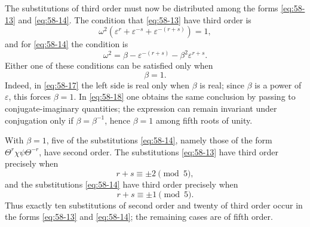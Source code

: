 \documentclass[11pt]{article}
\newcommand{\eps}{\varepsilon}
\begin{document}
The substitutions of third order must now be distributed among the forms \eqref{eq:58-13} and \eqref{eq:58-14}.  The condition that \eqref{eq:58-13} have third order is
\begin{equation}\label{eq:58-17}
 \omega^2(\eps^r+\eps^{-s}+\eps^{-(r+s)})=1,
\end{equation}
and for \eqref{eq:58-14} the condition is
\begin{equation}\label{eq:58-18}
 \omega^2=\beta-\eps^{-(r+s)}-\beta^2\eps^{r+s}.
\end{equation}
Either one of these conditions can be satisfied only when
\[
 \beta=1.
\]
Indeed, in \eqref{eq:58-17} the left side is real only when \(\beta\) is real; since \(\beta\) is a power of \(\eps\), this forces \(\beta=1\).  In \eqref{eq:58-18} one obtains the same conclusion by passing to conjugate-imaginary quantities; the expression can remain invariant under conjugation only if \(\beta=\beta^{-1}\), hence \(\beta=1\) among fifth roots of unity.

With \(\beta=1\), five of the substitutions \eqref{eq:58-14}, namely those of the form \(\Theta^r\chi\psi\Theta^{-r}\), have second order.  The substitutions \eqref{eq:58-13} have third order precisely when
\begin{equation}\label{eq:58-third-a}
 r+s\equiv \pm 2 \pmod 5,
\end{equation}
and the substitutions \eqref{eq:58-14} have third order precisely when
\begin{equation}\label{eq:58-third-b}
 r+s\equiv \pm 1 \pmod 5.
\end{equation}
Thus exactly ten substitutions of second order and twenty of third order occur in the forms \eqref{eq:58-13} and \eqref{eq:58-14}; the remaining cases are of fifth order.
\end{document}
